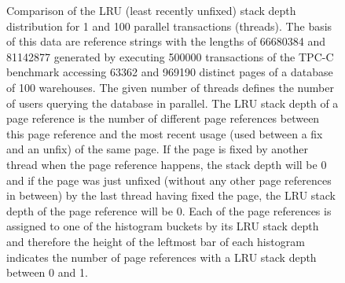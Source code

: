 \begin{@empty}
\begin{figure}[ht!]
        \caption[LRU stack depth distribution for 1 and 100 threads]{Comparison of the LRU (least recently unfixed) stack depth distribution for 1 and 100 parallel transactions (threads). The basis of this data are reference strings with the lengths of \num{66680384} and \num{81142877} generated by executing \num{500000} transactions of the TPC-C benchmark accessing \num{63362} and \num{969190} distinct pages of a database of 100 warehouses. The given number of threads defines the number of users querying the database in parallel. The LRU stack depth of a page reference is the number of different page references between this page reference and the most recent usage (used between a fix and an unfix) of the same page. If the page is fixed by another thread when the page reference happens, the stack depth will be 0 and if the page was just unfixed (without any other page references in between) by the last thread having fixed the page, the LRU stack depth of the page reference will be 0. Each of the page references is assigned to one of the histogram buckets by its LRU stack depth and therefore the height of the leftmost bar of each histogram indicates the number of page references with a LRU stack depth between 0 and 1.}
        \label{fig:locality}
    \end{figure}
\end{@empty}

